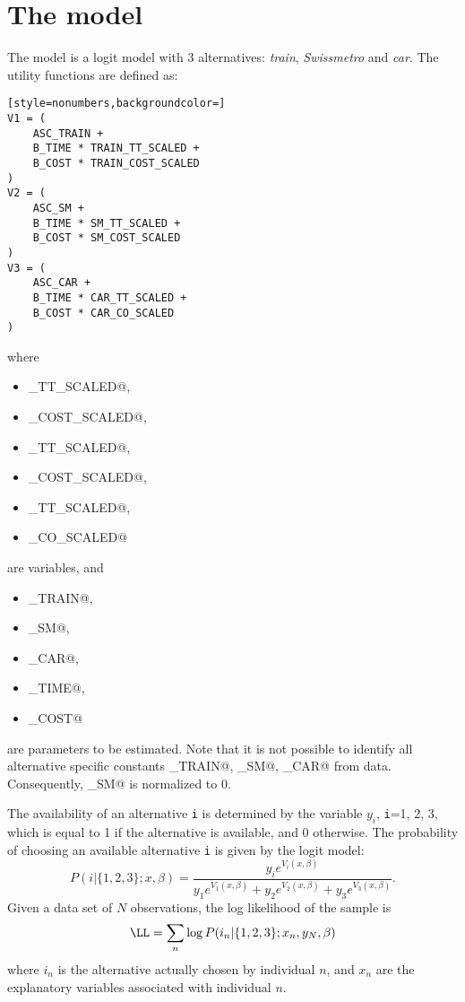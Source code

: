 \documentclass[12pt,a4paper]{article}
\begin{document}
\section{The model}
The model is a logit model with 3 alternatives: \emph{train}, \emph{Swissmetro} and \emph{car}. The utility functions are defined as:
\begin{lstlisting}[style=nonumbers,backgroundcolor=]
V1 = (
    ASC_TRAIN +
    B_TIME * TRAIN_TT_SCALED +
    B_COST * TRAIN_COST_SCALED
)
V2 = (
    ASC_SM +
    B_TIME * SM_TT_SCALED +
    B_COST * SM_COST_SCALED
)
V3 = (
    ASC_CAR +
    B_TIME * CAR_TT_SCALED +
    B_COST * CAR_CO_SCALED
)
\end{lstlisting}
where
\begin{itemize}
\item \lstinline@TRAIN_TT_SCALED@,
\item \lstinline@TRAIN_COST_SCALED@,
\item \lstinline@SM_TT_SCALED@,
\item \lstinline@SM_COST_SCALED@,
\item \lstinline@CAR_TT_SCALED@,
\item \lstinline@CAR_CO_SCALED@
\end{itemize}
are variables, and
\begin{itemize}
\item   \lstinline@ASC_TRAIN@,
\item   \lstinline@ASC_SM@,
\item   \lstinline@ASC_CAR@,
\item   \lstinline@B_TIME@,
\item   \lstinline@B_COST@
\end{itemize}
  are parameters to be estimated. Note that it is not possible to identify all alternative specific constants  
  \lstinline@ASC_TRAIN@,
  \lstinline@ASC_SM@,
  \lstinline@ASC_CAR@ from data. Consequently,  \lstinline@ASC_SM@
  is normalized to 0. 

The availability of an alternative \texttt{i} is determined by the
variable $y_i$, \texttt{i}=1, 2, 3, which is equal to 1 if the
alternative is available, and 0 otherwise. The probability of choosing an
available alternative \texttt{i} is given by the logit model: 
\begin{equation}
P(i|\{1,2,3\};x,\beta) = \frac{y_i e^{V_i(x,\beta)}}{y_1 e^{V_1(x,\beta)} + y_2 e^{V_2(x,\beta)}+ y_3 e^{V_3(x,\beta)}}.
\end{equation}
Given a data set of $N$ observations, the log likelihood of the
sample is 
\begin{equation}
\LL = \sum_n \log P(i_n|\{1,2,3\};x_n, y_N, \beta)
\end{equation}
where $i_n$ is the alternative actually chosen
by individual $n$, and $x_n$ are the explanatory variables associated with
individual $n$.  
\end{document}
